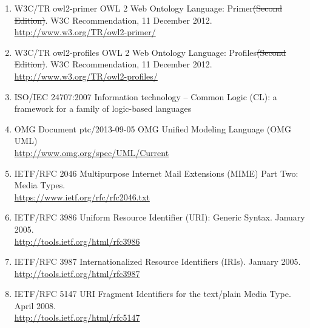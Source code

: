 \documentclass[10pt, a4paper]{isov2}
\providecommand{\DIFaddtex}[1]{{\protect\color{blue}\uwave{#1}}} %
\providecommand{\DIFdeltex}[1]{{\protect\color{red}\sout{#1}}}                      %
\providecommand{\DIFaddbegin}{} %
\providecommand{\DIFaddend}{} %
\providecommand{\DIFdelbegin}{} %
\providecommand{\DIFdelend}{} %
\providecommand{\DIFadd}[1]{\texorpdfstring{\DIFaddtex{#1}}{#1}} %
\providecommand{\DIFdel}[1]{\texorpdfstring{\DIFdeltex{#1}}{}} %
\begin{document}
\begin{enumerate} [label=\bfseries NR\arabic*]
{  \DIFdelbegin %
\DIFdelend \DIFaddbegin \url{http://www.w3.org/TR/xml/}\DIFaddend }\label{nref-XML}
  \DIFdelbegin %
\DIFdelend \DIFaddbegin \item{W3C/TR owl2-primer} \DIFaddend {OWL 2 Web Ontology Language: Primer\DIFdelbegin \DIFdel{(Second Edition)}\DIFdelend . W3C Recommendation, 11 December 2012. \\
  \DIFdelbegin %
\DIFdelend \DIFaddbegin \url{http://www.w3.org/TR/owl2-primer/}\DIFaddend }\label{nref-OWL2-primer}
  \DIFdelbegin %
\DIFdelend \DIFaddbegin \item{W3C/TR owl2-profiles} \DIFaddend {OWL 2 Web Ontology Language: Profiles\DIFdelbegin \DIFdel{(Second Edition)}\DIFdelend . W3C Recommendation, 11 December 2012. \\
  \DIFdelbegin %
\DIFdelend \DIFaddbegin \url{http://www.w3.org/TR/owl2-profiles/}\DIFaddend }\label{nref-OWL2-profiles}
  \item{ISO/IEC 24707:2007} {Information technology – Common Logic (CL): a framework for a family of logic-based languages\DIFaddbegin \DIFadd{.}\DIFaddend }\label{nref-CL}
  \item{OMG Document ptc/2013-09-05} {OMG Unified Modeling Language (OMG UML)\DIFaddbegin \DIFadd{.}\DIFaddend \\
  \url{http://www.omg.org/spec/UML/Current}}\label{nref-UML} %
  \item{IETF/RFC 2046} {Multipurpose Internet Mail Extensions (MIME)
    Part Two: Media Types.\\ 
    \url{https://www.ietf.org/rfc/rfc2046.txt}}\label{nref-text/plain}
  \item{IETF/RFC 3986} {Uniform Resource Identifier (URI): Generic Syntax. January 2005.\\ \url{http://tools.ietf.org/html/rfc3986}}\label{nref-URI}
  \item{IETF/RFC 3987} {Internationalized Resource Identifiers (IRIs). January 2005.\\ \url{http://tools.ietf.org/html/rfc3987}}\label{nref-IRI}
  \item{IETF/RFC 5147} {URI Fragment Identifiers for the text/plain Media Type.  April 2008.\\ \url{http://tools.ietf.org/html/rfc5147}}\label{nref-text/plain-URI}

\end{enumerate}
\end{document}
